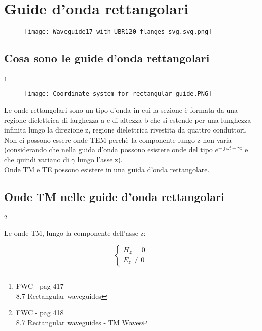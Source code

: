 \chapter{Guide d'onda rettangolari} 

\begin{figure}[h]
    \centering
    \texttt{[image: Waveguide17-with-UBR120-flanges-svg.svg.png]}
\end{figure} 

\newpage 

\section{Cosa sono le guide d'onda rettangolari} 

\footnote{FWC - pag 417 \\ 8.7 Rectangular waveguides}

\begin{figure}[h]
    \centering
    \texttt{[image: Coordinate system for rectangular guide.PNG]}
\end{figure} 

Le onde rettangolari sono un tipo d'onda in cui la sezione è formata da una regione dielettrica di larghezza 
a e di altezza b che si estende per una lunghezza infinita lungo la direzione z, 
regione dielettrica rivestita da quattro conduttori. \\ 

Non ci possono essere onde TEM perchè la componente lungo z non varia (considerando che nella guida d'onda possono 
esistere onde del tipo $e^{-\jmath \omega t - \gamma z}$ e che quindi variano di $\gamma$ lungo l'asse z). \\ 

Onde TM e TE possono esistere in una guida d'onda rettangolare. 

\newpage 

\section{Onde TM nelle guide d'onda rettangolari} 

\footnote{FWC - pag 418 \\ 8.7 Rectangular waveguides - TM Waves} 

Le onde TM, lungo la componente dell'asse z: 

{
    \Large 
    \begin{equation}
        \begin{cases}
            H_z = 0 \\ 
            E_z \neq 0
        \end{cases}
    \end{equation}
}

